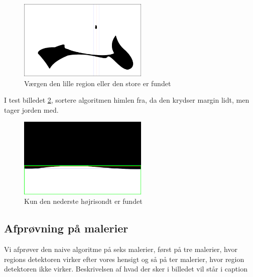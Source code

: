 \begin{figure}[!h]
	\begin{center}
       	\includegraphics[angle=0,width=0.55\textwidth]{afsnit/afprovning/billeder/naive_losning/naiv_blob2.png}
	\end{center}
	\caption{Værgen den lille region eller den store er fundet} 
   	\label{naiv_blob2}
\end{figure}

I test billedet \ref{naive_hoisont1}, sortere algoritmen
himlen fra, da den krydser margin lidt, men tager jorden med. 

\begin{figure}[!h]
	\begin{center}
       	\includegraphics[angle=0,width=0.55\textwidth]{afsnit/afprovning/billeder/naive_losning/naiv_hoisont1.png}
	\end{center}
	\caption{Kun den nederste højrisondt er fundet} 
   	\label{naive_hoisont1}
\end{figure}

\clearpage

\subsection{Afprøvning på malerier}
Vi afprøver den naive algoritme på seks malerier, først på tre malerier,
hvor regions detektoren virker efter vores hensigt og så på ter
malerier, hvor region detektoren ikke virker. Beskrivelsen af hvad der
sker i billedet vil står i caption


